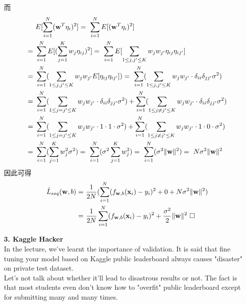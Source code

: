 \documentclass{article}
\begin{document}
而
\begin{align*}
    &E[\sum_{i = 1}^{N} ({\bf w}^T {\bf \eta}_i)^2]
    =\ \sum_{i = 1}^{N} E[({\bf w}^T {\bf \eta}_i)^2]\\
    =\ &\sum_{i = 1}^{N} E[(\sum_{j = 1}^{K} w_j \eta_{ij})^2]
    =\ \sum_{i = 1}^{N} E[\sum_{1 \le j, j^\prime \le K} w_j w_{j^\prime} \eta_{ij} \eta_{ij^\prime}]\\
    =\ &\sum_{i = 1}^{N} (\sum_{1 \le j, j^\prime \le K} w_j w_{j^\prime} E[\eta_{ij} \eta_{ij^\prime}])
    =\ \sum_{i = 1}^{N} (\sum_{1 \le j, j^\prime \le K} w_j w_{j^\prime} \cdot \delta_{ii} \delta_{jj^\prime} \sigma^2)\\
    =\ &\sum_{i = 1}^{N} (\sum_{1 \le j = j^\prime \le K} w_j w_{j^\prime} \cdot \delta_{ii} \delta_{jj^\prime} \sigma^2) +
    \sum_{i = 1}^{N} (\sum_{1 \le j \ne j^\prime \le K} w_j w_{j^\prime} \cdot \delta_{ii} \delta_{jj^\prime} \sigma^2)\\
    =\ &\sum_{i = 1}^{N} (\sum_{1 \le j = j^\prime \le K} w_j w_{j^\prime} \cdot 1 \cdot 1 \cdot \sigma^2) +
    \sum_{i = 1}^{N} (\sum_{1 \le j \ne j^\prime \le K} w_j w_{j^\prime} \cdot 1 \cdot 0 \cdot \sigma^2)\\
    =\ &\sum_{i = 1}^{N} (\sum_{j = 1}^{K} w_j^2 \sigma^2)
    =\ \sum_{i = 1}^{N} (\sigma^2 \sum_{j = 1}^{K} w_j^2)
    =\ \sum_{i = 1}^{N} (\sigma^2 \lVert {\bf w} \rVert^2)
    =\ N \sigma^2 \lVert {\bf w} \rVert^2
\end{align*}
因此可得
\begin{align*}
    \tilde{L}_{ssq} ({\bf w}, b) =\ &\frac{1}{2N} (\sum_{i = 1}^{N} (f_{{\bf w}, b} ({\bf x}_i) - y_i)^2 + 0 + N \sigma^2 \lVert {\bf w} \rVert^2)\\
    =\ &\frac{1}{2N} \sum_{i = 1}^{N} (f_{{\bf w}, b} ({\bf x}_i) - y_i)^2 + \frac{\sigma^2}{2} \lVert {\bf w} \rVert^2\ \square
\end{align*}

\noindent
{\bf \Large 3. Kaggle Hacker}\\

In the lecture, we've learnt the importance of validation. It is said that fine tuning your model based on Kaggle public leaderboard always causes "disaster" on private test dataset.\\

Let's not talk about whether it'll lead to disastrous results or not. The fact is that most students even don't know how to "overfit" public leaderboard except for submitting many and many times.\\
\end{document}
